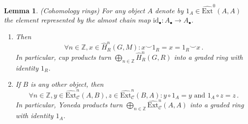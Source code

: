 \documentclass[12pt, a4paper]{article}
\numberwithin{equation}{section}
\newtheorem{lem}[thm]{Lemma}
\theoremstyle{empty}
\theoremstyle{nonumberplain}
\begin{document}
\begin{lem}\label{lem:cohomrings}
(Cohomology rings)\newline
For any object $A$ denote by $1_A \in \widehat{\mathrm{Ext}}^0(A, A)$ the element represented by the almost chain map $\mathrm{id}_{\bullet}: A_{\bullet} \rightarrow A_{\bullet}$.
\begin{enumerate}
    \item Then
    \[ \forall n \in \mathbb{Z}, x \in \widehat{H}_R^n(G, M): x \smile 1_R = x = 1_R \smile x \, . \]
    In particular, cup products turn $\bigoplus_{n \in \mathbb{Z}} \widehat{H}_R^n(G, R)$ into a graded ring with identity $1_R$.
    \item If $B$ is any other object, then
    \[ \forall n \in \mathbb{Z}, y \in \widehat{\mathrm{Ext}}_{\mathcal{C}}^n(A, B), z \in \widehat{\mathrm{Ext}}_{\mathcal{C}}^n(B, A): y \circ 1_A = y \text{ and } 1_A \circ z = z \, . \]
    In particular, Yoneda products turn $\bigoplus_{n \in \mathbb{Z}} \widehat{\mathrm{Ext}}_{\mathcal{C}}^n(A, A)$ into a graded ring with identity $1_A$.
\end{enumerate}
\end{lem}
\end{document}
